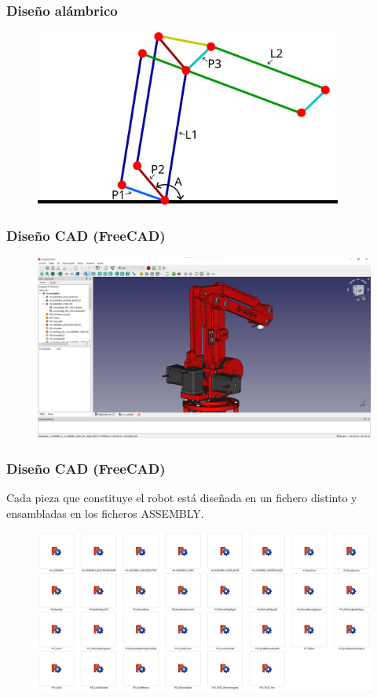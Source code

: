 \documentclass{beamer}
\begin{document}
\begin{frame}
  \frametitle{Diseño alámbrico}
  \begin{figure}[h]
    \centering
    \includegraphics[width=0.9\textwidth]{figs/alambrico_params.png}
  \end{figure}
\end{frame}

\begin{frame}
  \frametitle{Diseño CAD (FreeCAD)}
  \begin{figure}[h]
    \centering
    \includegraphics[width=1\textwidth]{figs/freecadUI.png}
  \end{figure}
\end{frame}

\begin{frame}
  \frametitle{Diseño CAD (FreeCAD)}
  Cada pieza que constituye el robot está diseñada en un fichero distinto y ensambladas en los ficheros ASSEMBLY.
  \begin{figure}[h]
    \centering
    \includegraphics[width=1\textwidth]{figs/freecadFiles.png}
  \end{figure}
\end{frame}
\end{document}
